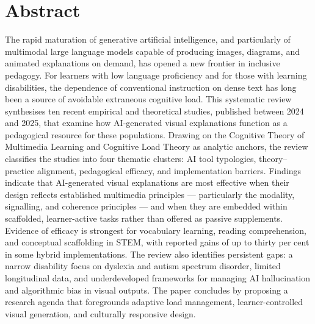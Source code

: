 %
%
\chapter{Abstract}
\begin{SingleSpace}
The rapid maturation of generative artificial intelligence, and particularly of multimodal large language models capable of producing images, diagrams, and animated explanations on demand, has opened a new frontier in inclusive pedagogy. For learners with low language proficiency and for those with learning disabilities, the dependence of conventional instruction on dense text has long been a source of avoidable extraneous cognitive load. This systematic review synthesises ten recent empirical and theoretical studies, published between 2024 and 2025, that examine how AI-generated visual explanations function as a pedagogical resource for these populations. Drawing on the Cognitive Theory of Multimedia Learning and Cognitive Load Theory as analytic anchors, the review classifies the studies into four thematic clusters: AI tool typologies, theory--practice alignment, pedagogical efficacy, and implementation barriers. Findings indicate that AI-generated visual explanations are most effective when their design reflects established multimedia principles --- particularly the modality, signalling, and coherence principles --- and when they are embedded within scaffolded, learner-active tasks rather than offered as passive supplements. Evidence of efficacy is strongest for vocabulary learning, reading comprehension, and conceptual scaffolding in STEM, with reported gains of up to thirty per cent in some hybrid implementations. The review also identifies persistent gaps: a narrow disability focus on dyslexia and autism spectrum disorder, limited longitudinal data, and underdeveloped frameworks for managing AI hallucination and algorithmic bias in visual outputs. The paper concludes by proposing a research agenda that foregrounds adaptive load management, learner-controlled visual generation, and culturally responsive design.

\end{SingleSpace}
